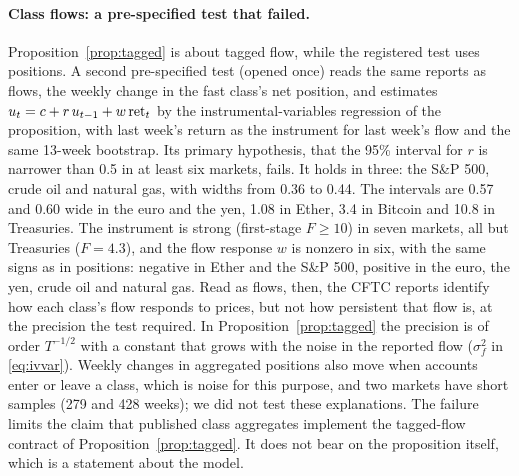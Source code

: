 \documentclass[12pt]{article}
\theoremstyle{definition}
\theoremstyle{remark}
\begin{document}
\paragraph{Class flows: a pre-specified test that failed.} Proposition~\ref{prop:tagged} is about tagged flow, while the registered test uses positions. A second pre-specified test (opened once) reads the same reports as flows, the weekly change in the fast class's net position, and estimates $u_t=c+r\,u_{t-1}+w\,{\rm ret}_t$ by the instrumental-variables regression of the proposition, with last week's return as the instrument for last week's flow and the same 13-week bootstrap. Its primary hypothesis, that the 95\% interval for $r$ is narrower than 0.5 in at least six markets, fails. It holds in three: the S\&P 500, crude oil and natural gas, with widths from 0.36 to 0.44. The intervals are 0.57 and 0.60 wide in the euro and the yen, 1.08 in Ether, 3.4 in Bitcoin and 10.8 in Treasuries. The instrument is strong (first-stage $F\ge10$) in seven markets, all but Treasuries ($F=4.3$), and the flow response $w$ is nonzero in six, with the same signs as in positions: negative in Ether and the S\&P 500, positive in the euro, the yen, crude oil and natural gas. Read as flows, then, the CFTC reports identify how each class's flow responds to prices, but not how persistent that flow is, at the precision the test required. In Proposition~\ref{prop:tagged} the precision is of order $T^{-1/2}$ with a constant that grows with the noise in the reported flow ($\sigma_f^2$ in \eqref{eq:ivvar}). Weekly changes in aggregated positions also move when accounts enter or leave a class, which is noise for this purpose, and two markets have short samples (279 and 428 weeks); we did not test these explanations. The failure limits the claim that published class aggregates implement the tagged-flow contract of Proposition~\ref{prop:tagged}. It does not bear on the proposition itself, which is a statement about the model.
\end{document}
